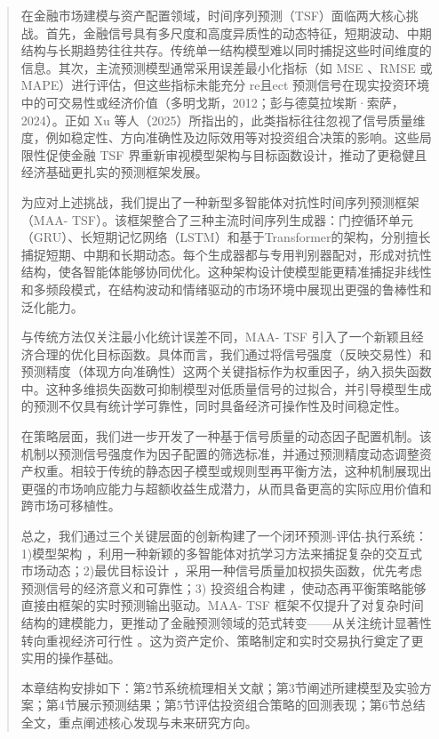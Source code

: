 \documentclass[UTF8]{ctexart}
\begin{document}
\begin{quote}
在金融市场建模与资产配置领域，时间序列预测（TSF）面临两大核心挑战。首先，金融信号具有多尺度和高度异质性的动态特征，短期波动、中期结构与长期趋势往往共存。传统单一结构模型难以同时捕捉这些时间维度的信息。其次，主流预测模型通常采用误差最小化指标（如
MSE 、RMSE 或 MAPE）进行评估，但这些指标未能充分 re且ect
预测信号在现实投资环境中的可交易性或经济价值（多明戈斯，2012；彭与德莫拉埃斯·索萨，2024）。正如
Xu
等人（2025）所指出的，此类指标往往忽视了信号质量维度，例如稳定性、方向准确性及边际效用等对投资组合决策的影响。这些局限性促使金融
TSF
界重新审视模型架构与目标函数设计，推动了更稳健且经济基础更扎实的预测框架发展。

为应对上述挑战，我们提出了一种新型多智能体对抗性时间序列预测框架（MAA-
TSF）。该框架整合了三种主流时间序列生成器：门控循环单元（GRU）、长短期记忆网络（LSTM）和基于Transformer的架构，分别擅长捕捉短期、中期和长期动态。每个生成器都与专用判别器配对，形成对抗性结构，使各智能体能够协同优化。这种架构设计使模型能更精准捕捉非线性和多频段模式，在结构波动和情绪驱动的市场环境中展现出更强的鲁棒性和泛化能力。

与传统方法仅关注最小化统计误差不同，MAA- TSF
引入了一个新颖且经济合理的优化目标函数。具体而言，我们通过将信号强度（反映交易性）和预测精度（体现方向准确性）这两个关键指标作为权重因子，纳入损失函数中。这种多维损失函数可抑制模型对低质量信号的过拟合，并引导模型生成的预测不仅具有统计学可靠性，同时具备经济可操作性及时间稳定性。

在策略层面，我们进一步开发了一种基于信号质量的动态因子配置机制。该机制以预测信号强度作为因子配置的筛选标准，并通过预测精度动态调整资产权重。相较于传统的静态因子模型或规则型再平衡方法，这种机制展现出更强的市场响应能力与超额收益生成潜力，从而具备更高的实际应用价值和跨市场可移植性。

总之，我们通过三个关键层面的创新构建了一个闭环预测-评估-执行系统：1)模型架构
，利用一种新颖的多智能体对抗学习方法来捕捉复杂的交互式市场动态；2)最优目标设计
，采用一种信号质量加权损失函数，优先考虑预测信号的经济意义和可靠性；3)
投资组合构建 ，使动态再平衡策略能够直接由框架的实时预测输出驱动。MAA-
TSF
框架不仅提升了对复杂时间结构的建模能力，更推动了金融预测领域的范式转变------从关注统计显著性转向重视经济可行性
。这为资产定价、策略制定和实时交易执行奠定了更实用的操作基础。

本章结构安排如下：第2节系统梳理相关文献；第3节阐述所建模型及实验方案；第4节展示预测结果；第5节评估投资组合策略的回测表现；第6节总结全文，重点阐述核心发现与未来研究方向。
\end{quote}
\end{document}
